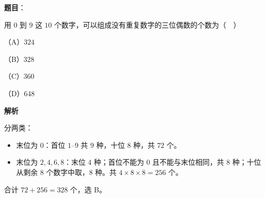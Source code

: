 \begin{answer}

\textbf{题目}：

用 $0$ 到 $9$ 这 $10$ 个数字，可以组成没有重复数字的三位偶数的个数为（　）

（A）$324$

（B）$328$

（C）$360$

（D）$648$

\textbf{解析}

分两类：

\begin{itemize}
\item 末位为 $0$：首位 $1$–$9$ 共 $9$ 种，十位 $8$ 种，共 $72$ 个。
\item 末位为 $2,4,6,8$：末位 $4$ 种；首位不能为 $0$ 且不能与末位相同，共 $8$ 种；十位从剩余 $8$ 个数字中取，$8$ 种。共 $4\times8\times8=256$ 个。
\end{itemize}

合计 $72+256=328$ 个，选 B。


\end{answer}
